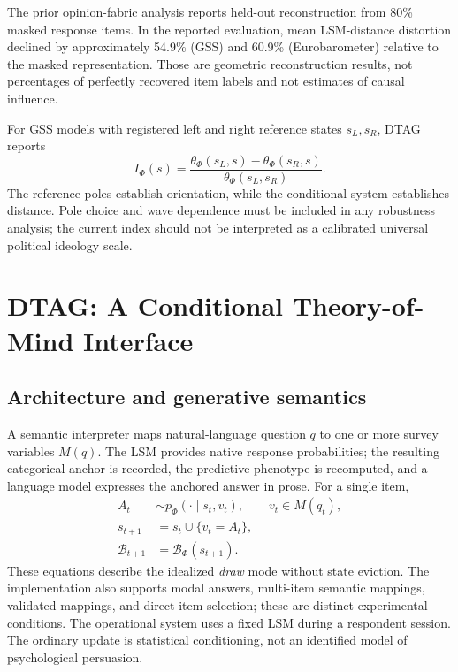 \documentclass[journal,10pt]{IEEEtran}
\newcommand{\calB}{\mathcal{B}}
\newcommand{\Ph}{\Phi}
\begin{document}
The prior opinion-fabric analysis \cite{dahal2026} reports held-out reconstruction from 80\% masked response items. In the reported evaluation, mean LSM-distance distortion declined by approximately 54.9\% (GSS) and 60.9\% (Eurobarometer) relative to the masked representation. Those are geometric reconstruction results, not percentages of perfectly recovered item labels and not estimates of causal influence.

For GSS models with registered left and right reference states $s_L,s_R$, DTAG reports
\begin{equation}
I_\Ph(s)=\frac{\theta_\Ph(s_L,s)-\theta_\Ph(s_R,s)}
{\theta_\Ph(s_L,s_R)}.
\label{eq:ideology}
\end{equation}
The reference poles establish orientation, while the conditional system establishes distance. Pole choice and wave dependence must be included in any robustness analysis; the current index should not be interpreted as a calibrated universal political ideology scale.

\section{DTAG: A Conditional Theory-of-Mind Interface}
\subsection{Architecture and generative semantics}
A semantic interpreter maps natural-language question $q$ to one or more survey variables $M(q)$. The LSM provides native response probabilities; the resulting categorical anchor is recorded, the predictive phenotype is recomputed, and a language model expresses the anchored answer in prose. For a single item,
\begin{align}
A_t&\sim p_\Ph(\cdot\mid s_t,v_t),\qquad v_t\in M(q_t),\label{eq:draw}\\
s_{t+1}&=s_t\cup\{v_t=A_t\},\label{eq:update}\\
\calB_{t+1}&=\calB_\Ph(s_{t+1}).\label{eq:posterior}
\end{align}
These equations describe the idealized \emph{draw} mode without state eviction. The implementation also supports modal answers, multi-item semantic mappings, validated mappings, and direct item selection; these are distinct experimental conditions. The operational system uses a fixed LSM during a respondent session. The ordinary update is statistical conditioning, not an identified model of psychological persuasion.
\end{document}
